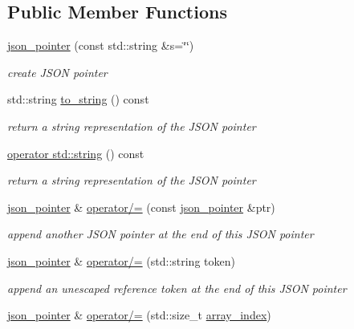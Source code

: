 \subsection*{Public Member Functions}
\begin{DoxyCompactItemize}
\item 
\hyperlink{classnlohmann_1_1json__pointer_a7f32d7c62841f0c4a6784cf741a6e4f8}{json\+\_\+pointer} (const std\+::string \&s=\char`\"{}\char`\"{})
\begin{DoxyCompactList}\small\item\em create J\+S\+ON pointer \end{DoxyCompactList}\item 
std\+::string \hyperlink{classnlohmann_1_1json__pointer_a0e203d3501feea7b7b739bce01de304f}{to\+\_\+string} () const 
\begin{DoxyCompactList}\small\item\em return a string representation of the J\+S\+ON pointer \end{DoxyCompactList}\item 
\hyperlink{classnlohmann_1_1json__pointer_a1c4a7d93216a5de8966e757b34bab64d}{operator std\+::string} () const 
\begin{DoxyCompactList}\small\item\em return a string representation of the J\+S\+ON pointer \end{DoxyCompactList}\item 
\hyperlink{classnlohmann_1_1json__pointer}{json\+\_\+pointer} \& \hyperlink{classnlohmann_1_1json__pointer_a7395bd0af29ac23fd3f21543c935cdfa}{operator/=} (const \hyperlink{classnlohmann_1_1json__pointer}{json\+\_\+pointer} \&ptr)
\begin{DoxyCompactList}\small\item\em append another J\+S\+ON pointer at the end of this J\+S\+ON pointer \end{DoxyCompactList}\item 
\hyperlink{classnlohmann_1_1json__pointer}{json\+\_\+pointer} \& \hyperlink{classnlohmann_1_1json__pointer_abdd21567b2b1d69329af0f520335e68b}{operator/=} (std\+::string token)
\begin{DoxyCompactList}\small\item\em append an unescaped reference token at the end of this J\+S\+ON pointer \end{DoxyCompactList}\item 
\hyperlink{classnlohmann_1_1json__pointer}{json\+\_\+pointer} \& \hyperlink{classnlohmann_1_1json__pointer_a64c8401529131bad1e486d91d703795f}{operator/=} (std\+::size\+\_\+t \hyperlink{classnlohmann_1_1json__pointer_ac53f5b79dd91da78743c437832f57ce4}{array\+\_\+index})

\end{DoxyCompactItemize}
